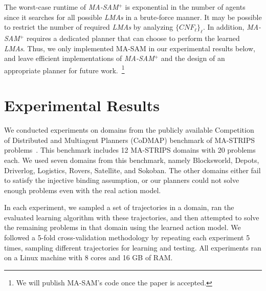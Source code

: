 \documentclass[letterpaper]{article} %
\theoremstyle{definition}
\theoremstyle{remark}
\newcommand{\cnf}{\textit{CNF}}
\newcommand{\liftl}{\ensuremath{\ell}}
\newcommand{\lifta}{\mathsf{a}}
\newcommand{\iseff}{\text{IsEff}}
\newcommand{\masam}{\ac{MA-SAM}\xspace}
\newcommand{\cmasam}{\textit{MA-SAM\ensuremath{^+}}\xspace}
\newcommand{\blmaas}{\textit{LMAs}\xspace}
\newcommand{\pbl}{pb-literal\xspace}
\newcommand{\roni}[1]{{\textcolor{red}{[Roni: #1]}}}
\begin{document}
 


The worst-case runtime of \cmasam is exponential in the number of agents since it searches for all possible \blmaas in a brute-force manner. 
It may be possible to restrict the number of required \blmaas by analyzing $\{\cnf_\liftl\}_\liftl$. 
In addition, \cmasam requires a dedicated planner that can choose to perform the learned \blmaas. 
Thus, we only implemented \masam in our experimental results below, and leave efficient implementations of \cmasam and the design of an appropriate planner for future work.~\footnote{We will publish \masam's code once the paper is accepted.}  


\section{Experimental Results}

We conducted experiments on domains from the publicly available Competition of Distributed and Multiagent Planners (CoDMAP) benchmark of MA-STRIPS problems~\cite{vstolba2016competition}. 
This benchmark includes 12 MA-STRIPS domains with 20 problems each.
We used seven domains from this benchmark, namely 
Blocksworld, Depots, Driverlog, Logistics, Rovers, Satellite, and Sokoban. %
The other domains either fail to satisfy the injective binding assumption, or our planners could not solve enough problems even with the real action model. 

In each experiment, we sampled a set of trajectories in a domain, 
ran the evaluated learning algorithm with these trajectories, 
and then attempted to solve the remaining problems in that domain using the learned action model. 
We followed a 5-fold cross-validation methodology by repeating each experiment 5 times, sampling different trajectories for learning and testing. 
All experiments ran on a Linux machine with 8 cores and 16 GB of RAM. 
\end{document}
